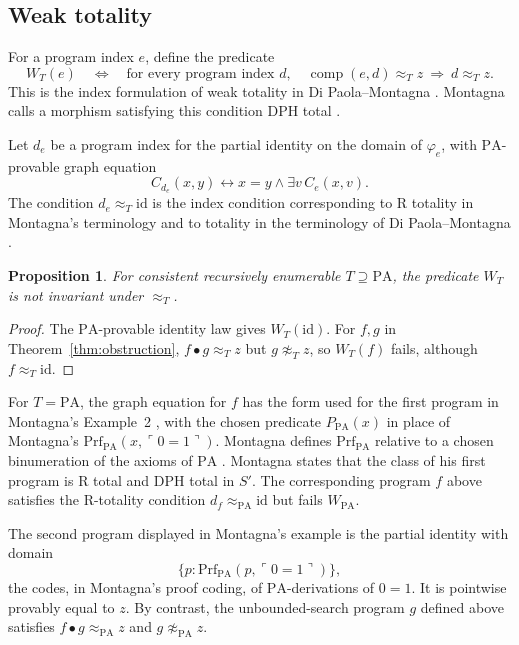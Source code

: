 \documentclass[11pt]{article}
\newtheorem{proposition}[theorem]{Proposition}
\newcommand{\PA}{\mathrm{PA}}
\newcommand{\comp}{\operatorname{comp}}
\begin{document}
\subsection{Weak totality}

For a program index $e$, define the predicate
\begin{equation}\label{eq:weak}
 W_T(e)\quad\Longleftrightarrow\quad
 \text{for every program index }d,\quad
 \comp(e,d)\approx_Tz\ \Longrightarrow\ d\approx_Tz.
\end{equation}
This is the index formulation of weak totality in Di Paola--Montagna
\cite[Definition~1.5, p.~645]{DiPaolaMontagna}. Montagna calls a morphism
satisfying this condition DPH total \cite[Definition~1.1, p.~106]{Montagna}.

Let $d_e$ be a program index for the partial identity on the domain of
$\varphi_e$, with $\PA$-provable graph equation
\[
 C_{d_e}(x,y)\longleftrightarrow x=y\land\exists v\,C_e(x,v).
\]
The condition $d_e\approx_T\mathrm{id}$ is the index condition
corresponding to R totality in Montagna's terminology
\cite[Definitions~1.6--1.7, p.~107]{Montagna} and to totality in the
terminology of Di Paola--Montagna
\cite[Definition~1.4, p.~645]{DiPaolaMontagna}.

\begin{proposition}\label{prop:weak}
For consistent recursively enumerable $T\supseteq\PA$, the predicate
$W_T$ is not invariant under $\approx_T$.
\end{proposition}

\begin{proof}
The $\PA$-provable identity law gives $W_T(\mathrm{id})$.
For $f,g$ in Theorem~\ref{thm:obstruction},
$f\bullet g\approx_Tz$ but $g\not\approx_Tz$, so $W_T(f)$ fails,
although $f\approx_T\mathrm{id}$.
\end{proof}

For $T=\PA$, the graph equation for $f$ has the form used for the first
program in Montagna's Example~2 \cite[p.~112]{Montagna}, with the chosen
predicate $P_{\PA}(x)$ in place of Montagna's
$\mathrm{Prf}_{\PA}(x,\ulcorner0=1\urcorner)$. Montagna defines
$\mathrm{Prf}_{\PA}$ relative to a chosen binumeration of the axioms of
$\PA$ \cite[note~2, p.~115]{Montagna}. Montagna states that the class of
his first program is R total and DPH total in $S'$. The corresponding
program $f$ above satisfies the R-totality condition
$d_f\approx_{\PA}\mathrm{id}$ but fails $W_{\PA}$.

The second program displayed in Montagna's example is the partial identity
with domain
\[
 \{p:\mathrm{Prf}_{\PA}(p,\ulcorner0=1\urcorner)\},
\]
the codes, in Montagna's proof coding, of $\PA$-derivations of $0=1$. It is
pointwise provably equal to $z$. By contrast, the unbounded-search program
$g$ defined above satisfies $f\bullet g\approx_{\PA}z$ and
$g\not\approx_{\PA}z$.
\end{document}
